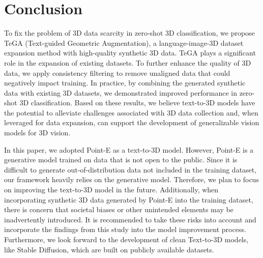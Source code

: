 \section{Conclusion}


To fix the problem of 3D data scarcity in zero-shot 3D classification, we propose TeGA (Text-guided Geometric Augmentation), a language-image-3D dataset expansion method with high-quality synthetic 3D data. TeGA plays a significant role in the expansion of existing datasets.
To further enhance the quality of 3D data, we apply consistency filtering to remove unaligned data that could negatively impact training. In practice, by combining the generated synthetic data with existing 3D datasets, we demonstrated improved performance in zero-shot 3D classification. 
Based on these results, we believe text-to-3D models have the potential to alleviate challenges associated with 3D data collection and, when leveraged for data expansion, can support the development of generalizable vision models for 3D vision.

 In this paper, we adopted Point-E as a text-to-3D model. However, Point-E is a generative model trained on data that is not open to the public. Since it is difficult to generate out-of-distribution data not included in the training dataset, our framework heavily relies on the generative model. Therefore, we plan to focus on improving the text-to-3D model in the future.
Additionally, when incorporating synthetic 3D data generated by Point-E into the training dataset, there is concern that societal biases or other unintended elements may be inadvertently introduced. It is recommended to take these risks into account and incorporate the findings from this study into the model improvement process. Furthermore, we look forward to the development of clean Text-to-3D models, like Stable Diffusion, which are built on publicly available datasets.
